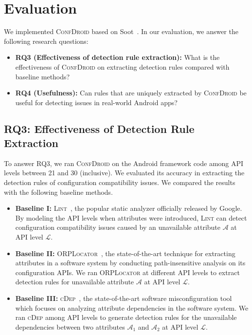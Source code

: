 \section{Evaluation}
\label{sec:5}
We implemented \textsc{ConfDroid} based on Soot~\cite{lam2011soot}.
In our evaluation, we answer the following research questions:
\begin{itemize}
	\item \textbf{RQ3 (Effectiveness of detection rule extraction):} What is the effectiveness of \textsc{ConfDroid} on extracting detection rules compared with baseline methods?
	\item \textbf{RQ4 (Usefulness):} Can rules that are uniquely extracted by \textsc{ConfDroid} be useful for detecting issues in real-world Android apps?
\end{itemize}

\subsection{RQ3: Effectiveness of Detection Rule Extraction}
\label{sec:rq3}

To answer RQ3, we ran \textsc{ConfDroid} on the Android framework code among
API levels between 21 and 30 (inclusive). We evaluated its accuracy in
extracting the detection rules of configuration compatibility issues.
We compared the results with the following baseline methods.
\begin{itemize}
	\item \textbf{Baseline I:} \textsc{Lint}~\cite{lint}, the popular static analyzer officially released by Google.
	By modeling the API levels when attributes were introduced, \textsc{Lint} can detect configuration compatibility issues caused by an unavailable attribute $\mathcal{A}$ at API level $\mathcal{L}$.
	\item \textbf{Baseline II:}
	\textsc{ORPLocator}~\cite{dong2016orplocator}, the state-of-the-art
	technique for extracting attributes in a software system by conducting path-insensitive analysis on its configuration APIs.
	We ran \textsc{ORPLocator} at different API levels to extract detection
	rules for unavailable attribute $\mathcal{A}$ at API level $\mathcal{L}$.
	\item \textbf{Baseline III:}
	\textsc{cDep}~\cite{chen2020understanding}, the state-of-the-art software misconfiguration tool which focuses on analyzing attribute dependencies in the software system.
	We ran \textsc{cDep} among API levels to generate detection rules for the unavailable dependencies between two attributes $\mathcal{A}_1$ and $\mathcal{A}_2$ at API level $\mathcal{L}$.
\end{itemize}

